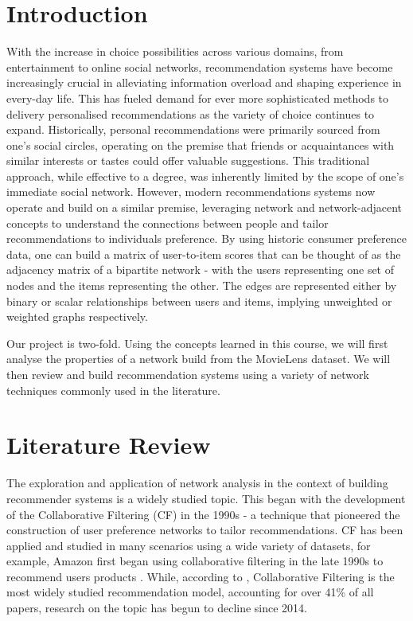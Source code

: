 \documentclass[12pt]{article}
\numberwithin{equation}{section}
\begin{document}
\newpage

\section{Introduction}

With the increase in choice possibilities across various domains, from entertainment to online social networks, recommendation systems have become increasingly crucial in alleviating information overload and shaping experience in every-day life. This has fueled demand for ever more sophisticated methods to delivery personalised recommendations as the variety of choice continues to expand. Historically, personal recommendations were primarily sourced from one's social circles, operating on the premise that friends or acquaintances with similar interests or tastes could offer valuable suggestions. This traditional approach, while effective to a degree, was inherently limited by the scope of one's immediate social network. However, modern recommendations systems now operate and build on a similar premise, leveraging network and network-adjacent concepts to understand the connections between people and tailor recommendations to individuals preference. By using historic consumer preference data, one can build a matrix of user-to-item scores that can be thought of as the adjacency matrix of a bipartite network - with the users representing one set of nodes and the items representing the other. The edges are represented either by binary or scalar relationships between users and items, implying unweighted or weighted graphs respectively.

Our project is two-fold. Using the concepts learned in this course, we will first analyse the properties of a network build from the MovieLens dataset. We will then review and build recommendation systems using a variety of network techniques commonly used in the literature.

\section{Literature Review}

The exploration and application of network analysis in the context of building recommender systems is a widely studied topic. This began with the development of the Collaborative Filtering (CF) in the 1990s - a technique that pioneered the construction of user preference networks to tailor recommendations. CF has been applied and studied in many scenarios using a wide variety of datasets, for example, Amazon first began using collaborative filtering in the late 1990s to recommend users products \cite{collab_f}. While, according to \cite{survey_reccomendation}, Collaborative Filtering is the most widely studied recommendation model, accounting for over 41\% of all papers, research on the topic has begun to decline since 2014.
\end{document}
